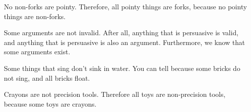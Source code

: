 \begin{exercises}
\item No non-forks are pointy. Therefore, all pointy things are forks, because no pointy things are non-forks. 


\item Some arguments are not invalid. After all, anything that is persuasive is valid, and anything that is persuasive is also an argument. Furthermore, we know that some arguments exist.



\item Some things that sing don't sink in water. You can tell because some bricks do not sing, and all bricks float.
 


\item Crayons are not precision tools. Therefore all toys are non-precision tools, because some toys are crayons.


\end{exercises}
